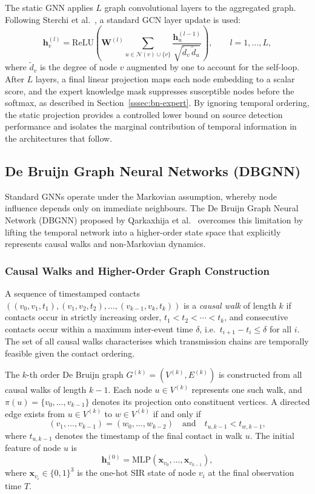 The static GNN applies $L$ graph convolutional layers to the aggregated graph. Following Sterchi et al.~\cite{Sterchi2025}, a standard GCN layer update is used:
\[
    \mathbf{h}_v^{(l)} = \mathrm{ReLU}\!\left(\mathbf{W}^{(l)} \sum_{u \in \mathcal{N}(v) \cup \{v\}} \frac{\mathbf{h}_u^{(l-1)}}{\sqrt{\tilde{d}_v\, \tilde{d}_u}}\right), \qquad l = 1, \ldots, L,
\]
where $\tilde{d}_v$ is the degree of node $v$ augmented by one to account for the self-loop. After $L$ layers, a final linear projection maps each node embedding to a scalar score, and the expert knowledge mask suppresses susceptible nodes before the softmax, as described in Section~\ref{sssec:bn-expert}. By ignoring temporal ordering, the static projection provides a controlled lower bound on source detection performance and isolates the marginal contribution of temporal information in the architectures that follow.

\subsection{De Bruijn Graph Neural Networks (DBGNN)}
\label{ssst:debruijnmodel}

Standard GNNs operate under the Markovian assumption, whereby node influence depends only on immediate neighbours. The De Bruijn Graph Neural Network (DBGNN) proposed by Qarkaxhija et al.~\cite{Qarkaxhija2022} overcomes this limitation by lifting the temporal network into a higher-order state space that explicitly represents causal walks and non-Markovian dynamics.

\subsubsection{Causal Walks and Higher-Order Graph Construction}
\label{sssec:dbgnn-construction}

A sequence of timestamped contacts $((v_0, v_1, t_1), (v_1, v_2, t_2), \ldots, (v_{k-1}, v_k, t_k))$ is a \textit{causal walk} of length $k$ if contacts occur in strictly increasing order, $t_1 < t_2 < \cdots < t_k$, and consecutive contacts occur within a maximum inter-event time $\delta$, i.e.\ $t_{i+1} - t_i \leq \delta$ for all $i$. The set of all causal walks characterises which transmission chains are temporally feasible given the contact ordering.

The $k$-th order De Bruijn graph $G^{(k)} = (V^{(k)}, E^{(k)})$ is constructed from all causal walks of length $k-1$. Each node $u \in V^{(k)}$ represents one such walk, and $\pi(u) = \{v_0, \ldots, v_{k-1}\}$ denotes its projection onto constituent vertices. A directed edge exists from $u \in V^{(k)}$ to $w \in V^{(k)}$ if and only if
\[
    (v_1, \ldots, v_{k-1}) = (w_0, \ldots, w_{k-2}) \quad \text{and} \quad t_{u, k-1} < t_{w, k-1},
\]
where $t_{u, k-1}$ denotes the timestamp of the final contact in walk $u$. The initial feature of node $u$ is
\[
    \mathbf{h}_u^{(0)} = \mathrm{MLP}\!\left(\mathbf{x}_{v_0}, \ldots, \mathbf{x}_{v_{k-1}}\right),
\]
where $\mathbf{x}_{v_i} \in \{0,1\}^3$ is the one-hot SIR state of node $v_i$ at the final observation time $T$.

